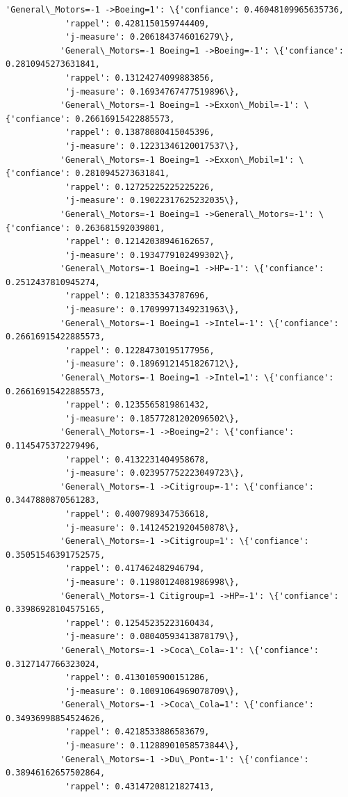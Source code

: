 \documentclass[11pt]{article}
\begin{document}
\begin{Verbatim}[commandchars=\\\{\}]
           'General\_Motors=-1 ->Boeing=1': \{'confiance': 0.46048109965635736,
            'rappel': 0.4281150159744409,
            'j-measure': 0.2061843746016279\},
           'General\_Motors=-1 Boeing=1 ->Boeing=-1': \{'confiance': 0.2810945273631841,
            'rappel': 0.13124274099883856,
            'j-measure': 0.16934767477519896\},
           'General\_Motors=-1 Boeing=1 ->Exxon\_Mobil=-1': \{'confiance': 0.26616915422885573,
            'rappel': 0.13878080415045396,
            'j-measure': 0.12231346120017537\},
           'General\_Motors=-1 Boeing=1 ->Exxon\_Mobil=1': \{'confiance': 0.2810945273631841,
            'rappel': 0.12725225225225226,
            'j-measure': 0.19022317625232035\},
           'General\_Motors=-1 Boeing=1 ->General\_Motors=-1': \{'confiance': 0.263681592039801,
            'rappel': 0.12142038946162657,
            'j-measure': 0.1934779102499302\},
           'General\_Motors=-1 Boeing=1 ->HP=-1': \{'confiance': 0.2512437810945274,
            'rappel': 0.1218335343787696,
            'j-measure': 0.17099971349231963\},
           'General\_Motors=-1 Boeing=1 ->Intel=-1': \{'confiance': 0.26616915422885573,
            'rappel': 0.12284730195177956,
            'j-measure': 0.18969121451826712\},
           'General\_Motors=-1 Boeing=1 ->Intel=1': \{'confiance': 0.26616915422885573,
            'rappel': 0.1235565819861432,
            'j-measure': 0.18577281202096502\},
           'General\_Motors=-1 ->Boeing=2': \{'confiance': 0.1145475372279496,
            'rappel': 0.4132231404958678,
            'j-measure': 0.023957752223049723\},
           'General\_Motors=-1 ->Citigroup=-1': \{'confiance': 0.3447880870561283,
            'rappel': 0.4007989347536618,
            'j-measure': 0.14124521920450878\},
           'General\_Motors=-1 ->Citigroup=1': \{'confiance': 0.35051546391752575,
            'rappel': 0.417462482946794,
            'j-measure': 0.11980124081986998\},
           'General\_Motors=-1 Citigroup=1 ->HP=-1': \{'confiance': 0.33986928104575165,
            'rappel': 0.12545235223160434,
            'j-measure': 0.08040593413878179\},
           'General\_Motors=-1 ->Coca\_Cola=-1': \{'confiance': 0.3127147766323024,
            'rappel': 0.4130105900151286,
            'j-measure': 0.10091064969078709\},
           'General\_Motors=-1 ->Coca\_Cola=1': \{'confiance': 0.34936998854524626,
            'rappel': 0.4218533886583679,
            'j-measure': 0.11288901058573844\},
           'General\_Motors=-1 ->Du\_Pont=-1': \{'confiance': 0.38946162657502864,
            'rappel': 0.43147208121827413,

\end{Verbatim}
\end{document}

